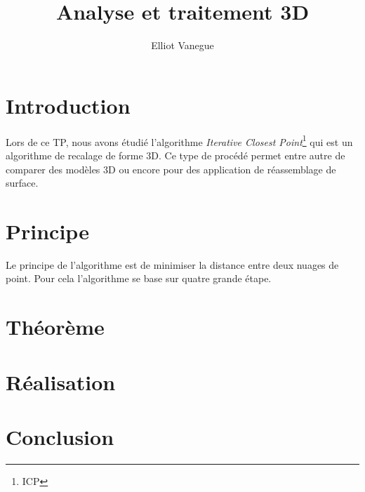 \documentclass[a4paper,10pt]{article}
\title{Analyse et traitement 3D}
\author{Elliot Vanegue}
\begin{document}
\maketitle

\section{Introduction}
Lors de ce TP, nous avons étudié l'algorithme \textit{Iterative Closest Point}\footnote{ICP} qui est un algorithme de
recalage de forme 3D. Ce type de procédé permet entre autre de comparer des modèles 3D ou encore pour des application 
de réassemblage de surface.

\section{Principe}
Le principe de l'algorithme est de minimiser la distance entre deux nuages de point. Pour cela l'algorithme se base 
sur quatre grande étape.

\section{Théorème}

\section{Réalisation}

\section{Conclusion}
\end{document}

